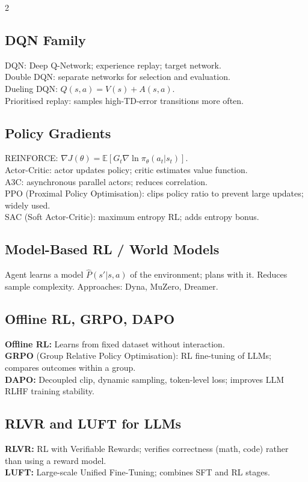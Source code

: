 \documentclass[10pt,a4paper]{article}
\begin{document}
\begin{multicols}{2}
\subsection{DQN Family}
DQN: Deep Q-Network; experience replay; target network.\\
Double DQN: separate networks for selection and evaluation.\\
Dueling DQN: $Q(s,a) = V(s) + A(s,a)$.\\
Prioritised replay: samples high-TD-error transitions more often.

\subsection{Policy Gradients}
REINFORCE: $\nabla J(\theta) = \mathbb{E}[G_t \nabla\ln\pi_\theta(a_t|s_t)]$.\\
Actor-Critic: actor updates policy; critic estimates value function.\\
A3C: asynchronous parallel actors; reduces correlation.\\
PPO (Proximal Policy Optimisation): clips policy ratio to prevent large updates; widely used.\\
SAC (Soft Actor-Critic): maximum entropy RL; adds entropy bonus.

\subsection{Model-Based RL / World Models}
Agent learns a model $\hat{P}(s'|s,a)$ of the environment; plans with it. Reduces sample complexity. Approaches: Dyna, MuZero, Dreamer.

\subsection{Offline RL, GRPO, DAPO}
\textbf{Offline RL:} Learns from fixed dataset without interaction.\\
\textbf{GRPO} (Group Relative Policy Optimisation): RL fine-tuning of LLMs; compares outcomes within a group.\\
\textbf{DAPO:} Decoupled clip, dynamic sampling, token-level loss; improves LLM RLHF training stability.

\subsection{RLVR and LUFT for LLMs}
\textbf{RLVR:} RL with Verifiable Rewards; verifies correctness (math, code) rather than using a reward model.\\
\textbf{LUFT:} Large-scale Unified Fine-Tuning; combines SFT and RL stages.


\end{multicols}
\end{document}
